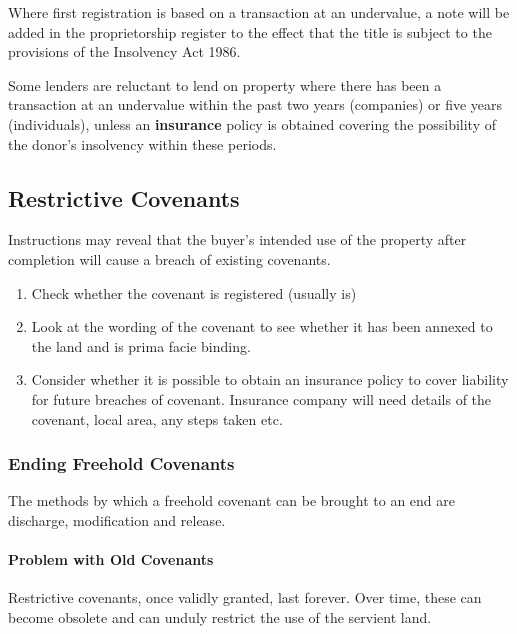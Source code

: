 \documentclass[
]{article}
\providecommand{\tightlist}{%
  \setlength{\itemsep}{0pt}\setlength{\parskip}{0pt}}
\begin{document}
Where first registration is based on a transaction at an undervalue, a
note will be added in the proprietorship register to the effect that the
title is subject to the provisions of the Insolvency Act 1986.

Some lenders are reluctant to lend on property where there has been a
transaction at an undervalue within the past two years (companies) or
five years (individuals), unless an \textbf{insurance} policy is
obtained covering the possibility of the donor's insolvency within these
periods.

\hypertarget{restrictive-covenants}{%
\subsection{Restrictive Covenants}\label{restrictive-covenants}}

Instructions may reveal that the buyer's intended use of the property
after completion will cause a breach of existing covenants.

\begin{enumerate}
\tightlist
\item
  Check whether the covenant is registered (usually is)
\item
  Look at the wording of the covenant to see whether it has been annexed
  to the land and is prima facie binding.
\item
  Consider whether it is possible to obtain an insurance policy to cover
  liability for future breaches of covenant. Insurance company will need
  details of the covenant, local area, any steps taken etc.
\end{enumerate}

\hypertarget{ending-freehold-covenants}{%
\subsubsection{Ending Freehold
Covenants}\label{ending-freehold-covenants}}

The methods by which a freehold covenant can be brought to an end are
discharge, modification and release.

\hypertarget{problem-with-old-covenants}{%
\paragraph{Problem with Old
Covenants}\label{problem-with-old-covenants}}

Restrictive covenants, once validly granted, last forever. Over time,
these can become obsolete and can unduly restrict the use of the
servient land.
\end{document}
